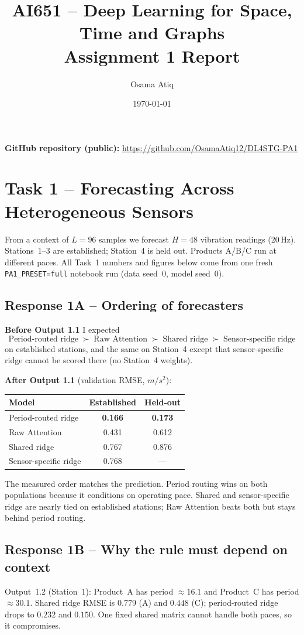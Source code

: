 \documentclass[11pt,a4paper]{article}
\title{AI651 -- Deep Learning for Space, Time and Graphs\\Assignment 1 Report}
\author{Osama Atiq}
\date{\today}
\begin{document}
\maketitle

\noindent\textbf{GitHub repository (public):}
\url{https://github.com/OsamaAtiq12/DL4STG-PA1}

\section{Task 1 -- Forecasting Across Heterogeneous Sensors}

From a context of $L{=}96$ samples we forecast $H{=}48$ vibration readings (20\,Hz). Stations~1--3 are established; Station~4 is held out. Products A/B/C run at different paces. All Task~1 numbers and figures below come from one fresh \texttt{PA1\_PRESET=full} notebook run (data seed~0, model seed~0).

\subsection{Response 1A -- Ordering of forecasters}
\textbf{Before Output 1.1} I expected
\[
\text{Period-routed ridge}
\;\succ\;
\text{Raw Attention}
\;\succ\;
\text{Shared ridge}
\;\succ\;
\text{Sensor-specific ridge}
\]
on established stations, and the same on Station~4 except that sensor-specific ridge cannot be scored there (no Station~4 weights).

\textbf{After Output 1.1} (validation RMSE, $m/s^2$):

\begin{center}
\begin{tabular}{lcc}
\toprule
Model & Established & Held-out \\
\midrule
Period-routed ridge & \textbf{0.166} & \textbf{0.173} \\
Raw Attention & 0.431 & 0.612 \\
Shared ridge & 0.767 & 0.876 \\
Sensor-specific ridge & 0.768 & --- \\
\bottomrule
\end{tabular}
\end{center}

The measured order matches the prediction. Period routing wins on both populations because it conditions on operating pace. Shared and sensor-specific ridge are nearly tied on established stations; Raw Attention beats both but stays behind period routing.

\subsection{Response 1B -- Why the rule must depend on context}
Output~1.2 (Station~1): Product~A has period ${\approx}16.1$ and Product~C has period ${\approx}30.1$. Shared ridge RMSE is $0.779$ (A) and $0.448$ (C); period-routed ridge drops to $0.232$ and $0.150$. One fixed shared matrix cannot handle both paces, so it compromises.
\end{document}
